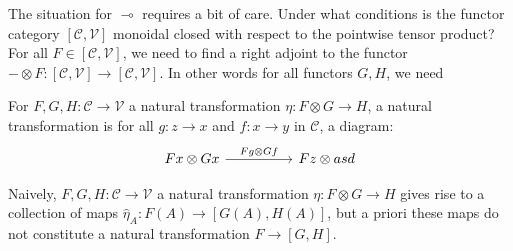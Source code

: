 \documentclass[a4paper,english]{lipics-v2018}
\begin{document}
The situation for $\multimap$ requires a bit of care. Under what conditions is the functor category $[\mathcal{C}, \mathcal{V}]$ monoidal closed with respect to the pointwise tensor product? For all $F \in [\mathcal{C}, \mathcal{V}]$, we need to find a right adjoint to the functor $- \otimes F : [\mathcal{C},\mathcal{V}] \to [\mathcal{C}, \mathcal{V}]$. In other words for all functors $G, H$, we need 

For $F, G, H : \mathcal{C} \to \mathcal{V}$ a natural transformation $\eta : F \otimes G \to H$, a natural transformation is for all $g : z \to x$ and $f : x \to y$ in $\mathcal{C}$, a diagram:
\[
  \begin{tikzcd}[row sep=huge, column sep=huge]
  Fx \otimes Gx  \ar[r, "{Fg \otimes Gf}"] & Fz \otimes asd
  \end{tikzcd}
\]


Naively, $F, G, H : \mathcal{C} \to \mathcal{V}$ a natural transformation $\eta : F \otimes G \to H$ gives rise to a collection of maps $\hat \eta_A : F(A) \to [G(A), H(A)]$, but a priori these maps do not constitute a natural transformation $F \to [G, H]$.
\end{document}
